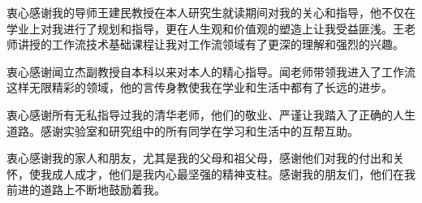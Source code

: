 
\begin{acknowledgement}


  衷心感谢我的导师王建民教授在本人研究生就读期间对我的关心和指导，他不仅在学业上对我进行了规划和指导，更在人生观和价值观的塑造上让我受益匪浅。王老师讲授的工作流技术基础课程让我对工作流领域有了更深的理解和强烈的兴趣。

  衷心感谢闻立杰副教授自本科以来对本人的精心指导。闻老师带领我进入了工作流这样无限精彩的领域，他的言传身教使我在学业和生活中都有了长远的进步。

  衷心感谢所有无私指导过我的清华老师，他们的敬业、严谨让我踏入了正确的人生道路。感谢实验室和研究组中的所有同学在学习和生活中的互帮互助。

  衷心感谢我的家人和朋友，尤其是我的父母和祖父母，感谢他们对我的付出和关怀，使我成人成才，他们是我内心最坚强的精神支柱。感谢我的朋友们，他们在我前进的道路上不断地鼓励着我。
\end{acknowledgement}
